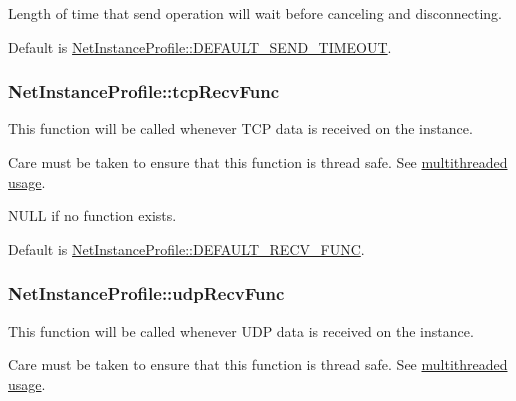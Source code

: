 Length of time that send operation will wait before canceling and disconnecting. 

Default is \hyperlink{class_net_instance_profile_a7a3abeb53ed94ac5a75c408f2684e909}{NetInstanceProfile::DEFAULT\_\-SEND\_\-TIMEOUT}. \hypertarget{class_net_instance_profile_a879b3034d521919570637748adefb6d8}{
\subsubsection[{tcpRecvFunc}]{ {\bf NetInstanceProfile::tcpRecvFunc}}}
\label{class_net_instance_profile_a879b3034d521919570637748adefb6d8}


This function will be called whenever TCP data is received on the instance. 

Care must be taken to ensure that this function is thread safe. See \hyperlink{multithreading_page}{multithreaded usage}.\par
\par


NULL if no function exists. \par
\par


Default is \hyperlink{class_net_instance_profile_a51f05ca66c76fdc588d34455d5185f6b}{NetInstanceProfile::DEFAULT\_\-RECV\_\-FUNC}. \hypertarget{class_net_instance_profile_a2825db403a006e006f4f0b6b4b50c0bb}{
\subsubsection[{udpRecvFunc}]{ {\bf NetInstanceProfile::udpRecvFunc}}}
\label{class_net_instance_profile_a2825db403a006e006f4f0b6b4b50c0bb}


This function will be called whenever UDP data is received on the instance. 

Care must be taken to ensure that this function is thread safe. See \hyperlink{multithreading_page}{multithreaded usage}.\par
\par


